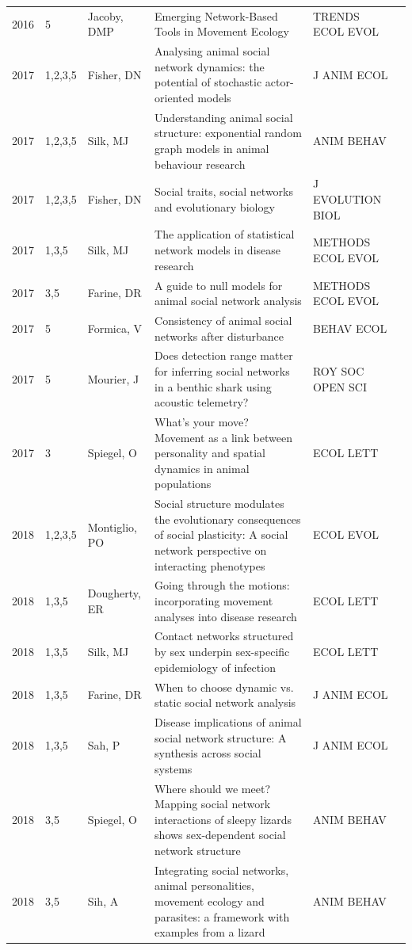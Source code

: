 \documentclass[11pt]{article} %
\begin{document}
\begin{longtable}{p{0.8cm}|p{1.25cm}|p{2.8cm}|p{7.5cm}|p{3cm}l}
2016&	5&	Jacoby, DMP&	 Emerging Network-Based Tools in Movement Ecology&         	TRENDS ECOL EVOL\\
2017&	1,2,3,5&	Fisher, DN&	 Analysing animal social network dynamics: the potential of stochastic actor-oriented models&         	J ANIM ECOL\\
2017&	1,2,3,5&	Silk, MJ&	 Understanding animal social structure: exponential random graph models in animal behaviour research&         	ANIM BEHAV\\
2017&	1,2,3,5&	Fisher, DN&	 Social traits, social networks and evolutionary biology&         	J EVOLUTION BIOL\\
2017&	1,3,5&	Silk, MJ&	 The application of statistical network models in disease research&         	METHODS ECOL EVOL\\
2017&	3,5&	Farine, DR&	 A guide to null models for animal social network analysis&         	METHODS ECOL EVOL\\
2017&	5&	Formica, V&	 Consistency of animal social networks after disturbance&         	BEHAV ECOL\\
2017&	5&	Mourier, J&	 Does detection range matter for inferring social networks in a benthic shark using acoustic telemetry?& ROY SOC OPEN SCI\\
2017&	3&	Spiegel, O&	 What's your move? Movement as a link between personality and spatial dynamics in animal populations& ECOL LETT\\
2018&	1,2,3,5&	Montiglio, PO&	 Social structure modulates the evolutionary consequences of social plasticity: A social network perspective on interacting phenotypes&         	ECOL EVOL\\
2018&	1,3,5&	Dougherty, ER&	 Going through the motions: incorporating movement analyses into disease research& ECOL LETT\\
2018&	1,3,5&	Silk, MJ&	 Contact networks structured by sex underpin sex-specific epidemiology of infection&         	ECOL LETT\\
2018&	1,3,5&	Farine, DR&	 When to choose dynamic vs. static social network analysis&         	J ANIM ECOL\\
2018&	1,3,5&	Sah, P&	 Disease implications of animal social network structure: A synthesis across social systems&         	J ANIM ECOL\\
2018&	3,5&	Spiegel, O&	 Where should we meet? Mapping social network interactions of sleepy lizards shows sex-dependent social network structure&         	ANIM BEHAV\\
2018&	3,5&	Sih, A&	 Integrating social networks, animal personalities, movement ecology and parasites: a framework with examples from a lizard&         	ANIM BEHAV\\

\end{longtable}
\end{document}
